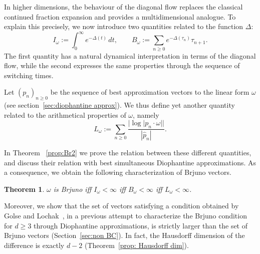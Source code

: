 \documentclass[12pt,reqno,a4paper]{amsart}%
\numberwithin{equation}{section}
\newtheorem{theorem}{Theorem}[section]
\newcommand{\Zz}{{\mathbb{Z}}}
\newcommand{\abs}[1]{\left| #1\right|}
\begin{document}
In higher dimensions, the behaviour of the diagonal flow replaces the classical continued fraction expansion and provides a multidimensional analogue.  
To explain this precisely,  we now introduce two quantities related to the function $\Delta$:
$$
I_\omega:=\int_0^\infty e^{-\Delta(t)}\,dt,
\qquad
B_\omega:=\sum_{n\geq0}e^{-\Delta(\tau_n)}\tau_{n+1}.
$$
The first quantity has a natural dynamical interpretation in terms of the diagonal flow, while the second expresses the same properties through the sequence of switching times.  

Let $(p_n)_{n\geq0}$ be the sequence of best approximation vectors to the linear form $\omega$ (see section~\ref{sec:diophantine approx}).
We thus define yet another quantity related to the arithmetical properties of $\omega$, namely
\[
 L_{\omega}:=\sum_{n\geq 0}\frac{|\log |p_n\cdot\omega||}{|\hat p_n|}.
\]





In  Theorem~ \ref{prop:Br2}  we prove the relation between these different quantities, and discuss their relation with
best simultaneous Diophantine approximations.
As a consequence, we obtain the following characterization of Brjuno vectors.



\begin{theorem}
$\omega$ is Brjuno iff 
$I_\omega<\infty$ iff $B_\omega<\infty$ iff $L_\omega<\infty$.
\end{theorem}

Moreover, we show that the set of vectors satisfying a condition obtained by
Golse and Lochak~\cite{GoLo}, in a previous attempt to characterize the Brjuno condition for $d\geq3$ through Diophantine approximations, is strictly larger than the set of Brjuno vectors (Section~\ref{sec:non BC}). In fact, the Hausdorff dimension of the difference is exactly $d-2$ (Theorem~\ref{prop: Hausdorff dim}).

\bigskip
\end{document}
